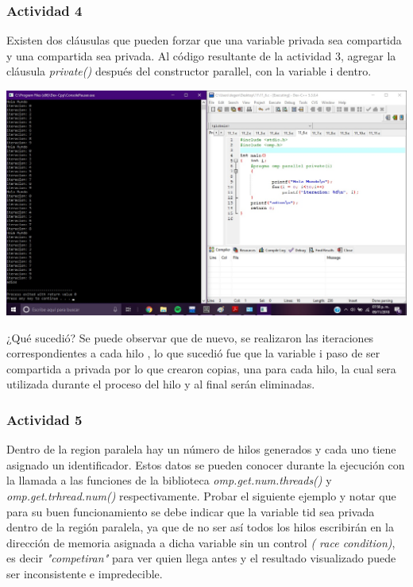 \documentclass[12pt,letterpaper]{article}
\begin{document}
\subsubsection*{Actividad 4}
Existen dos cláusulas que pueden forzar que una variable privada sea compartida y una compartida sea privada. 
Al código resultante de la actividad 3, agregar la cláusula \textit{private()}  después del constructor parallel, con la variable i dentro.
\begin{flushleft}
\includegraphics[scale=.5]{ejercicio4.jpg} 

\end{flushleft}

¿Qué sucedió? Se puede observar que de nuevo, se realizaron las iteraciones correspondientes a cada hilo , lo que sucedió fue que la variable i paso de ser compartida a privada por lo que crearon copias, una para cada hilo, la cual sera utilizada durante el proceso del hilo y al final serán eliminadas.

\subsubsection*{Actividad 5}
Dentro de la region paralela hay un número de hilos generados y cada uno tiene asignado un identificador. Estos datos se pueden conocer durante la ejecución con la llamada a las funciones de la biblioteca \textit{omp.get.num.threads()} y \textit{omp.get.trhread.num()} respectivamente.
Probar el siguiente ejemplo y notar que para su buen funcionamiento se debe indicar que la variable tid sea privada dentro de la región paralela, ya que de no ser así todos los hilos escribirán en la dirección de memoria asignada a dicha variable sin un control \textit{( race condition)}, es decir \textit{"competiran"} para ver quien llega antes y el resultado visualizado puede ser inconsistente e impredecible.
\end{document}
